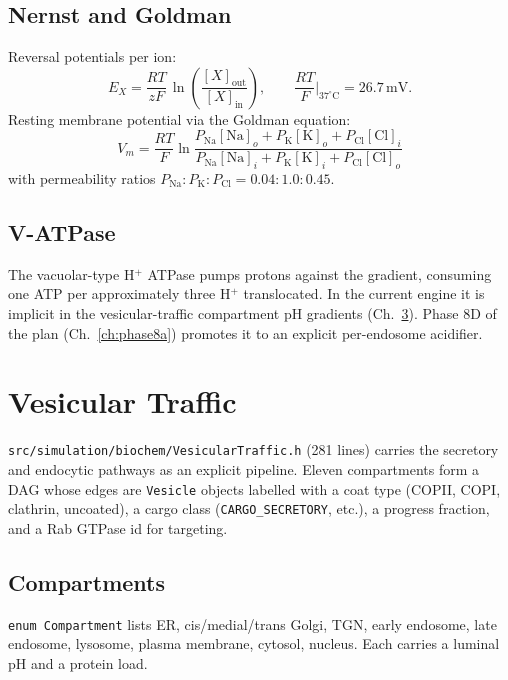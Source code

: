 \documentclass[11pt,letterpaper,twoside,openany]{book}
\newcommand{\code}[1]{\texttt{#1}}
\newcommand{\file}[1]{\texttt{\small#1}}
\begin{document}
\section{Nernst and Goldman}

Reversal potentials per ion:
\begin{equation}
  E_X = \frac{RT}{zF}\,\ln\!\left(\frac{[X]_\text{out}}{[X]_\text{in}}\right),
  \qquad \frac{RT}{F}\bigg|_{37^\circ\text{C}} = 26.7\,\text{mV}.
\end{equation}
Resting membrane potential via the Goldman equation:
\begin{equation}
  V_m = \frac{RT}{F} \ln\!
    \frac{P_\text{Na}[\text{Na}]_o + P_\text{K}[\text{K}]_o + P_\text{Cl}[\text{Cl}]_i}
         {P_\text{Na}[\text{Na}]_i + P_\text{K}[\text{K}]_i + P_\text{Cl}[\text{Cl}]_o}
\end{equation}
with permeability ratios $P_\text{Na}:P_\text{K}:P_\text{Cl} = 0.04:1.0:0.45$.

\section{V-ATPase}

The vacuolar-type H$^+$ ATPase pumps protons against the gradient,
consuming one ATP per approximately three H$^+$ translocated. In the
current engine it is implicit in the vesicular-traffic compartment
pH gradients (Ch.~\ref{ch:vesicular}). Phase 8D of the plan
(Ch.~\ref{ch:phase8a}) promotes it to an explicit per-endosome
acidifier.

\chapter{Vesicular Traffic}
\label{ch:vesicular}

\file{src/simulation/biochem/VesicularTraffic.h} (281 lines) carries
the secretory and endocytic pathways as an explicit pipeline. Eleven
compartments form a DAG whose edges are \code{Vesicle} objects
labelled with a coat type (COPII, COPI, clathrin, uncoated), a cargo
class (\code{CARGO\_SECRETORY}, etc.), a progress fraction, and a
Rab GTPase id for targeting.

\section{Compartments}

\code{enum Compartment} lists ER, cis/medial/trans Golgi, TGN, early
endosome, late endosome, lysosome, plasma membrane, cytosol, nucleus.
Each carries a luminal pH and a protein load.
\end{document}
